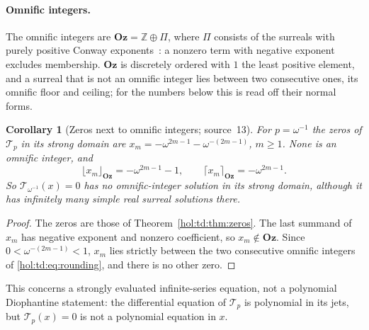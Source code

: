 \documentclass[11pt]{article}
\numberwithin{equation}{section}
\newtheorem{corollary}[theorem]{Corollary}
\theoremstyle{definition}
\theoremstyle{remark}
\newcommand{\Z}{\mathbb Z}
\newcommand{\Oz}{\mathbf{Oz}}
\begin{document}
\paragraph{Omnific integers.}
The omnific integers are $\Oz=\Z\oplus\Pi$, where $\Pi$ consists of the
surreals with purely positive Conway exponents~\cite[\texttt{odg:def:rings}]{repoodg}:
a nonzero term with negative exponent excludes membership. $\Oz$ is
discretely ordered with $1$ the least positive element, and a surreal that is
not an omnific integer lies between two consecutive ones, its omnific floor
and ceiling; for the numbers below this is read off their normal forms.

\begin{corollary}[Zeros next to omnific integers; source~13]
\label{hol:td:cor:omnific}
For $p=\omega^{-1}$ the zeros of $\mathcal T_p$ in its strong domain are
$x_m=-\omega^{2m-1}-\omega^{-(2m-1)}$, $m\ge1$. None is an omnific integer, and
\begin{equation}\label{hol:td:eq:rounding}
 \lfloor x_m\rfloor_{\Oz}=-\omega^{2m-1}-1,\qquad
 \lceil x_m\rceil_{\Oz}=-\omega^{2m-1}.
\end{equation}
So $\mathcal T_{\omega^{-1}}(x)=0$ has no omnific-integer solution in its strong
domain, although it has infinitely many simple real surreal solutions there.
\end{corollary}

\begin{proof}
The zeros are those of Theorem~\ref{hol:td:thm:zeros}. The last summand of
$x_m$ has negative exponent and nonzero coefficient, so $x_m\notin\Oz$. Since
$0<\omega^{-(2m-1)}<1$, $x_m$ lies strictly between the two consecutive
omnific integers of \eqref{hol:td:eq:rounding}, and there is no other zero.
\end{proof}

This concerns a strongly evaluated infinite-series equation, not a polynomial
Diophantine statement: the differential equation of $\mathcal T_p$ is
polynomial in its jets, but $\mathcal T_p(x)=0$ is not a polynomial equation in
$x$.
\end{document}
